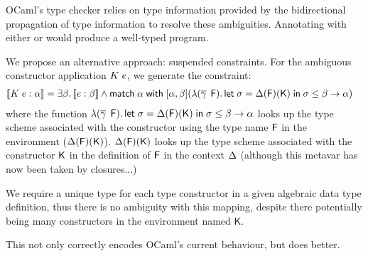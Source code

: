 \documentclass[acmsmall,screen,nonacm]{acmart}
\begin{document}
OCaml's type checker relies on type information provided by the
bidirectional  propagation of type
information to resolve these
ambiguities. Annotating  with either  or  would
produce a well-typed program.

We propose an alternative approach: suspended constraints. For the ambiguous
constructor application $K \; e$, we generate the constraint:
\begin{align*}
\llbracket K \; e : \alpha\rrbracket &=
  \exists {\beta}.\, \llbracket e : \beta\rrbracket
  \wedge
  \mathopen{}\mathrel{\mathsf{match}} \alpha \mathrel{\mathsf{with}} [ \alpha, \beta ] (\lambda {(\overline{\gamma} \mathop{}\mathrel{\mathrel{\mathsf{F}}\mathclose{}})}.\,{\mathopen{}\mathrel{\mathsf{let}} \sigma = \Delta(\mathrel{\mathsf{F}}\mathclose{})(\mathsf{K}) \mathrel{\mathsf{in}} \sigma \leq \beta \to \alpha}
      )
\end{align*}
where the function $\lambda {(\overline{\gamma} \mathop{}\mathrel{\mathrel{\mathsf{F}}\mathclose{}})}.\,{\mathopen{}\mathrel{\mathsf{let}} \sigma = \Delta(\mathrel{\mathsf{F}}\mathclose{})(\mathsf{K}) \mathrel{\mathsf{in}} \sigma \leq \beta \to \alpha}$ looks up the type scheme
associated with the constructor using the type name $\mathrel{\mathsf{F}}\mathclose{}$ in the environment
($\Delta(\mathrel{\mathsf{F}}\mathclose{})(\mathsf{K})$). 
\Xalistair
{$\Delta(\mathrel{\mathsf{F}}\mathclose{})(\mathsf{K})$ looks up the type scheme associated with the constructor $\mathsf{K}$
in the definition of $\mathrel{\mathsf{F}}\mathclose{}$ in the context $\Delta$ (although this metavar has now
been taken by closures...)}


We require a unique type for each type constructor in a given algebraic data
type definition, thus there is no ambiguity with this mapping, despite there
potentially being many constructors in the environment named $\mathsf{K}$.

This not only correctly encodes OCaml's current behaviour, but does better.
\end{document}
